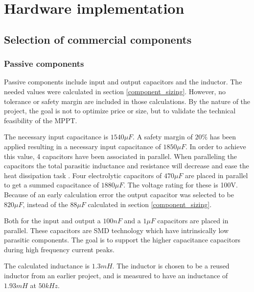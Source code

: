 
\chapter{Hardware implementation} \label{ch:hardware_implementation}


\section{Selection of commercial components}


\subsection{Passive components}

Passive components include input and output capacitors and the inductor. The needed values were calculated in section \ref{component_sizing}. However, no tolerance or safety margin are included in those calculations. By the nature of the project, the goal is not to optimize price or size, but to validate the technical feasibility of the MPPT. 

The necessary input capacitance is $1540 \mu F$. A safety margin of $20 \%$ has been applied resulting in a necessary input capacitance of $1850 \mu F$. In order to achieve this value, 4 capacitors have been associated in parallel. When paralleling the capacitors the total parasitic inductance and resistance will decrease and ease the heat dissipation task \cite{capacitor_paracitics}. Four electrolytic capacitors of $470\mu F$ \cite{cin} are placed in parallel to get a summed capacitance of $1880\mu F$. The voltage rating for these is 100V. Because of an early calculation error the output capacitor was selected to be $820\mu F$\cite{cout}, instead of the $88\mu F$ calculated in section \ref{component_sizing}.

Both for the input and output a $100nF$ and a $1\mu F$ capacitors are placed in parallel. These capacitors are SMD technology which have intrinsically low parasitic components. The goal is to support the higher capacitance capacitors during high frequency current peaks\cite{paracitics_stuff}.

The calculated inductance is $1.3 mH$. The inductor is chosen to be a reused inductor from an earlier project, and is measured to have an inductance of $1.93mH$ at $50kHz$. 











